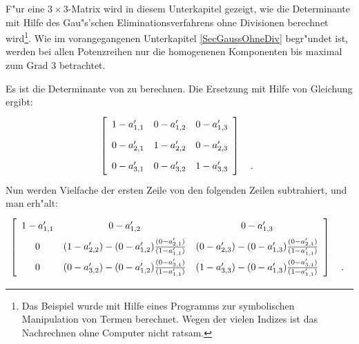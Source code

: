 \label{SecBeispielOhneDiv}

F"ur eine $3 \times 3$-Matrix wird in diesem Unterkapitel
gezeigt, wie die Determinante mit Hilfe des Gau"s'schen
Eliminationsverfahrens ohne Divisionen berechnet
wird\footnote{Das Beispiel wurde mit Hilfe eines Programms zur 
symbolischen Manipulation von Termen berechnet. Wegen der vielen Indizes
ist das Nachrechnen ohne Computer nicht ratsam.}. Wie im
vorangegangenen Unterkapitel \ref{SecGaussOhneDiv} begr"undet ist, werden
bei allen Potenzreihen nur die homogenenen Komponenten bis maximal zum
Grad $3$ betrachtet.

Es ist die Determinante von
\Eeq 
zu berechnen.
Die Ersetzung mit Hilfe von Gleichung  ergibt:
\[
    \left[
        \begin{array}{ccc}
            1 - a_{1,1}' & 0 - a_{1,2}' & 0 - a_{1,3}' \MatStrut \\
            0 - a_{2,1}' & 1 - a_{2,2}' & 0 - a_{2,3}' \MatStrut \\
            0 - a_{3,1}' & 0 - a_{3,2}' & 1 - a_{3,3}' \MatStrut
        \end{array}
    \right]
    \begin{array}{c}
        \MatStrut \\ \MatStrut \\ \MyPunkt \MatStrut
    \end{array}
\]
Nun werden Vielfache der ersten Zeile von
den folgenden Zeilen subtrahiert, und man erh"alt:
\[
    \left[
        \begin{array}{ccc}
            1 - a_{1,1}'
        &   0 - a_{1,2}'
        &   0 - a_{1,3}' \MatStrut
        \\     0
        &   (1 - a_{2,2}') - (0 - a_{1,2}')
            \frac{ (0 - a_{2,1}') }{ (1 - a_{1,1}') }
        &   (0 - a_{2,3}')  - (0 - a_{1,3}')
            \frac{ (0 - a_{2,1}') }{ (1 - a_{1,1}') } \MatStrut
        \\     0
        &   (0 - a_{3,2}') - (0 - a_{1,2}')
            \frac{ (0 - a_{3,1}') }{ (1 - a_{1,1}') }
        &   (1 - a_{3,3}') - (0 - a_{1,3}')
            \frac{ (0 - a_{3,1}') }{ (1 - a_{1,1}') } \MatStrut
        \end{array}
    \right]
    \begin{array}{c}
        \MatStrut \\ \MatStrut \\ \MyPunkt \MatStrut
    \end{array}
\]
